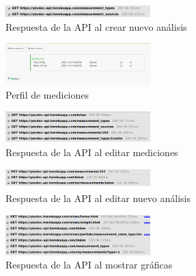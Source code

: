     \begin{figure}[h]
        \centering
        \includegraphics[width=0.5\textwidth]{img/5-crear_medicion}
        \caption{Respuesta de la API al crear nuevo análisis}
		\label{5-crear_medicion}
    \end{figure}
    
    
    
    
    \begin{figure}[h]
        \centering
        \includegraphics[width=0.5\textwidth]{img/5-perfil_mediciones}
        \caption{Perfil de mediciones}
		\label{5-perfil_mediciones}
    \end{figure}
    
    \begin{figure}[h]
        \centering
        \includegraphics[width=0.5\textwidth]{img/5-editar_medicion}
        \caption{Respuesta de la API al editar mediciones}
		\label{5-editar_medicion}
    \end{figure}
    
    \begin{figure}[h]
        \centering
        \includegraphics[width=0.5\textwidth]{img/5-fin_editar_medicion}
        \caption{Respuesta de la API al editar nuevo análisis}
		\label{5-fin_editar_medicion}
    \end{figure}
    
    \begin{figure}[h]
        \centering
        \includegraphics[width=0.5\textwidth]{img/5-mostrar_grafica}
        \caption{Respuesta de la API al mostrar gráficas}
		\label{5-mostrar_grafica}
    \end{figure}
    
